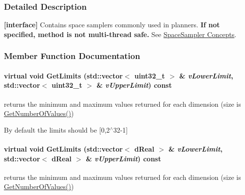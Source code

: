 \subsubsection{Detailed Description}
{\bfseries \mbox{[}interface\mbox{]}} Contains space samplers commonly used in planners. {\bfseries If not specified, method is not multi-\/thread safe.} See \hyperlink{arch__spacesampler}{SpaceSampler Concepts}. 

\subsubsection{Member Function Documentation}
\hypertarget{classOpenRAVE_1_1SpaceSamplerBase_afb999fb02a4ba0107783be362f3ec6fe}{
\paragraph[{GetLimits}]{\setlength{\rightskip}{0pt plus 5cm}virtual void GetLimits (std::vector$<$ uint32\_\-t $>$ \& {\em vLowerLimit}, \/  std::vector$<$ uint32\_\-t $>$ \& {\em vUpperLimit}) const}\hfill}
\label{classOpenRAVE_1_1SpaceSamplerBase_afb999fb02a4ba0107783be362f3ec6fe}


returns the minimum and maximum values returned for each dimension (size is \hyperlink{classOpenRAVE_1_1SpaceSamplerBase_a1c2746b270bee7389df0b315a18a719c}{GetNumberOfValues()}) 

By default the limits should be \mbox{[}0,2$^\wedge$32-\/1\mbox{]} \hypertarget{classOpenRAVE_1_1SpaceSamplerBase_a01de3c15828fffc3e8fde1384735f428}{
\paragraph[{GetLimits}]{\setlength{\rightskip}{0pt plus 5cm}virtual void GetLimits (std::vector$<$ dReal $>$ \& {\em vLowerLimit}, \/  std::vector$<$ dReal $>$ \& {\em vUpperLimit}) const}\hfill}
\label{classOpenRAVE_1_1SpaceSamplerBase_a01de3c15828fffc3e8fde1384735f428}


returns the minimum and maximum values returned for each dimension (size is \hyperlink{classOpenRAVE_1_1SpaceSamplerBase_a1c2746b270bee7389df0b315a18a719c}{GetNumberOfValues()}) 

